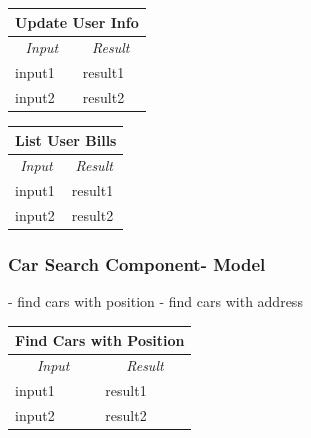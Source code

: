 \documentclass[english]{article}
\begin{document}
\begin{center}

	\begin{tabular}{ | p{6cm} | p{6cm} | }
		\hline 


		\hline

		\multicolumn{2}{|c|}{\textbf{Update User Info}} \\
		\hline
		\multicolumn{1}{|c|}{\textit{Input}} & \multicolumn{1}{c|}{\textit{Result}} \\
		\hline
		input1 & result1 \\
		\hline
		input2 & result2 \\
		\hline
	\end{tabular}
\end{center}

\begin{center}

	\begin{tabular}{ | p{6cm} | p{6cm} | }
		\hline 


		\hline

		\multicolumn{2}{|c|}{\textbf{List User Bills}} \\
		\hline
		\multicolumn{1}{|c|}{\textit{Input}} & \multicolumn{1}{c|}{\textit{Result}} \\
		\hline
		input1 & result1 \\
		\hline
		input2 & result2 \\
		\hline
	\end{tabular}
\end{center}

\subsubsection{Car Search Component- Model}
- find cars with position
- find cars with address

\begin{center}

	\begin{tabular}{ | p{6cm} | p{6cm} | }
		\hline 


		\hline

		\multicolumn{2}{|c|}{\textbf{Find Cars with Position}} \\
		\hline
		\multicolumn{1}{|c|}{\textit{Input}} & \multicolumn{1}{c|}{\textit{Result}} \\
		\hline
		input1 & result1 \\
		\hline
		input2 & result2 \\
		\hline
	\end{tabular}
\end{center}
\end{document}
